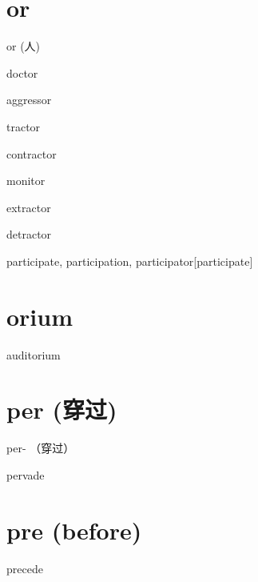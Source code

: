 \section{or}

{or (人)}

\begin{wordRef}{doctor}
\end{wordRef}

\begin{wordRef}{aggressor}
\end{wordRef}

\begin{wordRef}{tractor}
\end{wordRef}

\begin{wordRef}{contractor}
\end{wordRef}

\begin{wordRef}{monitor}
\end{wordRef}

\begin{wordRef}{extractor}
    
\end{wordRef}

\begin{wordRef}{detractor}
   
\end{wordRef}

\begin{wordRef}{participate, participation, participator}[participate]
\end{wordRef}

\section{orium}

\begin{wordRef}{auditorium}
\end{wordRef}

\section{per (穿过)}
{per- （穿过）}

\begin{wordRef}{pervade}
\end{wordRef}

\section{pre (before)}
\begin{wordRef}{precede}
\end{wordRef}

